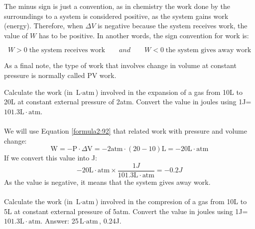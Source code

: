 \documentclass[main.tex]{subfiles}
\begin{document}
\begin{description}
The minus sign is just a convention, as in chemistry the work done by the surroundings to a system is considered positive, as the system gains work (energy). Therefore, when $\Delta V$ is negative because the system receives work, the value of $W$ has to be positive. In another words, the sign convention for work is:
\begin{solutionbox}
\[ W > 0 \; \text{the system receives work}\qquad and \qquad W < 0 \; \text{the system gives away work}\]
\end{solutionbox}
As a final note, the type of work that involves change in volume at constant pressure is normally called PV work.
\begin{example} %
Calculate the work (in $\text{L}\cdot \text{atm}$) involved in the expansion of a gas from 10L to 20L at constant external pressure of 2atm. Convert the value in joules using 1J=$101.3\text{L}\cdot \text{atm}$.\\
\\
We will use Equation \ref{formula2:92} that related work with pressure and volume change:
\[\text{W} = -\text{P}\cdot \Delta \text{V}=-2\text{atm}\cdot (20-10)\text{L}=-20\text{L}\cdot \text{atm} \]
If we convert this value into J:
\[-20\text{L}\cdot \text{atm}\times \frac{1J}{101.3\text{L}\cdot \text{atm}}=-0.2J \]
As the value is negative, it means that the system gives away work.\\
\faDiamond\ \\
Calculate the work (in $\text{L}\cdot \text{atm}$) involved in the compresion of a gas from 10L to 5L at constant external pressure of 5atm. Convert the value in joules using 1J=$101.3\text{L}\cdot \text{atm}$.
\flushright Answer: 25$\text{L}\cdot \text{atm}$, 0.24J.
\end{example}%






\end{description}
\end{document}
